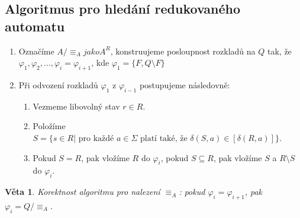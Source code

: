 \documentclass[10pt, a4paper, titlepage]{article}
\theoremstyle{note}
\newtheorem{veta}{Věta}
\begin{document}
\subsection{Algoritmus pro hled\'an\'i redukovan\'eho automatu}

\begin{enumerate}
\item
Označ\'ime $A/ \equiv_{A} jako A^{R}$, konstruujeme posloupnost rozkladů na $Q$ tak, že $\varphi_{1}, \varphi_{2}, \ldots, \varphi_{i} = \varphi_{i+1}$,
kde $\varphi_{1} = \lbrace F, Q \setminus F \rbrace$

\item
Při odvozen\'i rozkladů $\varphi_{1}$ z $\varphi_{i-1}$ postupujeme n\'asledovně:
\begin{enumerate}
\item
Vezmeme libovoln\'y stav $r \in R$.

\item
Polož\'ime $S = \lbrace s \in R | \text{ pro každ\'e } a \in \Sigma \text{ plat\'i tak\'e, že }\delta(S, a) \in [\delta(R, a)] \rbrace$.

\item
Pokud $S = R$, pak vlož\'ime $R$ do $\varphi_{i}$, pokud $S \subseteq R$, pak vlož\'ime $S$ a $R \setminus S$ do $\varphi_{i}$.
\end{enumerate}
\end{enumerate}

\begin{veta}
Korektnost algoritmu pro nalezen\'i $\equiv_{A}$: pokud $\varphi_{i} = \varphi_{i+1}$, pak $\varphi_{i} = Q/ \equiv_{A}$.
\end{veta}
\end{document}
